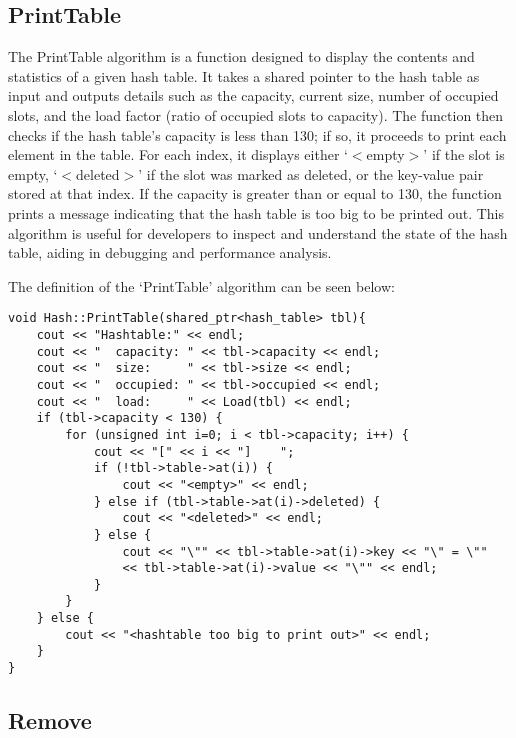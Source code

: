 \subsection*{PrintTable}

The PrintTable algorithm is a function designed to display the contents and statistics of a given hash table. It takes a shared pointer to the hash table as input and outputs details such as the capacity, 
current size, number of occupied slots, and the load factor (ratio of occupied slots to capacity). The function then checks if the hash table's capacity is less than 130; if so, it proceeds to print each 
element in the table. For each index, it displays either `$<$empty$>$' if the slot is empty, `$<$deleted$>$' if the slot was marked as deleted, or the key-value pair stored at that index. If the capacity is 
greater than or equal to 130, the function prints a message indicating that the hash table is too big to be printed out. This algorithm is useful for developers to inspect and understand the state of the 
hash table, aiding in debugging and performance analysis.

\begin{highlight}

The definition of the `PrintTable' algorithm can be seen below:

\horizontalline

\begin{verbatim}
void Hash::PrintTable(shared_ptr<hash_table> tbl){
    cout << "Hashtable:" << endl;
    cout << "  capacity: " << tbl->capacity << endl;
    cout << "  size:     " << tbl->size << endl;
    cout << "  occupied: " << tbl->occupied << endl;
    cout << "  load:     " << Load(tbl) << endl;
    if (tbl->capacity < 130) {
        for (unsigned int i=0; i < tbl->capacity; i++) {
            cout << "[" << i << "]    ";
            if (!tbl->table->at(i)) {
                cout << "<empty>" << endl;
            } else if (tbl->table->at(i)->deleted) {
                cout << "<deleted>" << endl;
            } else {
                cout << "\"" << tbl->table->at(i)->key << "\" = \"" 
                << tbl->table->at(i)->value << "\"" << endl;
            }
        }
    } else {
        cout << "<hashtable too big to print out>" << endl;
    }
}
\end{verbatim}

\end{highlight}

\subsection*{Remove}

